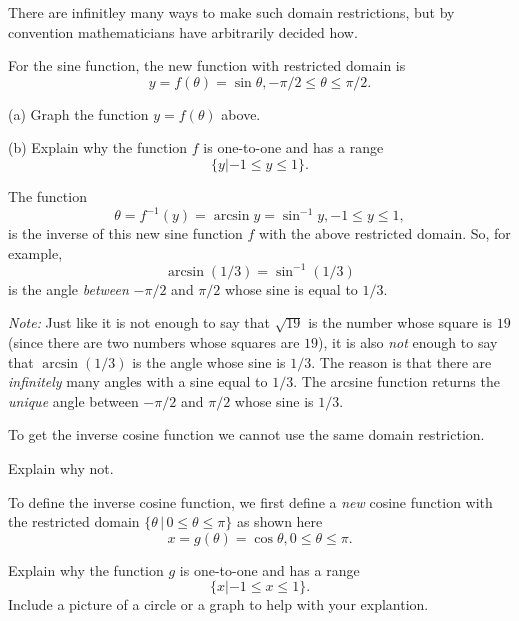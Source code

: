 \documentclass{ximera}
\begin{document}
There are infinitley many ways to make such domain restrictions, but by convention mathematicians have arbitrarily decided how.

For the sine function, the new function with restricted domain is 
\[
    y  = f(\theta) = \sin \theta , -\pi/2 \leq \theta \leq \pi/2 . 
\]

\begin{question}  \label{Q1:Inverse}
(a) Graph the function $y=f(\theta)$ above.

(b) Explain why the function $f$ is one-to-one and has a range 
\[
   \{y | -1 \leq y \leq 1\}. 
\]
\end{question}

The function
\[
   \theta = f^{-1}(y) = \arcsin y = \sin^{-1} y , -1\leq y \leq 1 ,
\]
is the inverse of this new sine function $f$ with the above restricted domain. So, for example, 
\[
    \arcsin (1/3) = \sin^{-1}(1/3)
\]
is the angle \emph{between} $-\pi/2$ and $\pi/2$ whose sine is equal to $1/3$. 

\emph{Note:} Just like it is not enough to say that $\sqrt{19}$ is the number whose square is $19$ (since there are two numbers whose squares are $19$), it is also \emph{not} enough to say that $\arcsin (1/3)$ is the angle whose sine is $1/3$. The reason is that there are \emph{infinitely} many angles with a sine equal to $1/3$. The arcsine function returns the \emph{unique} angle between $-\pi/2$ and $\pi/2$ whose sine is $1/3$.



To get the inverse cosine function we cannot use the same domain restriction.

\begin{question}  \label{Q2:Inverse}
Explain why not.
\end{question}

To define the inverse cosine function, we first define a \emph{new} cosine function with the restricted domain $\{\theta \, | \, 0\leq \theta \leq \pi \}$ as shown here
\[
    x  = g(\theta) = \cos \theta , 0 \leq \theta \leq \pi . 
\]

\begin{question}  \label{Q3:Inverse}
Explain why the function $g$ is one-to-one and has a range 
\[
   \{x | -1 \leq x \leq 1\}. 
\]
Include a picture of a circle or a graph to help with your explantion.
\end{question}
\end{document}
